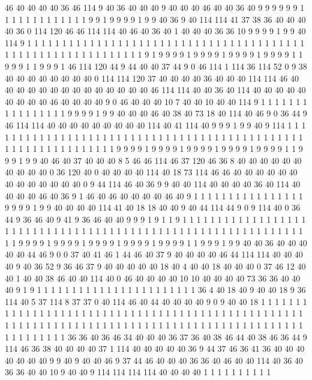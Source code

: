 46 40 40 40 40 36 46 114 9 40 36 40 40 40 9 40 40 40 46 40
40 36 40 9 9 9 9 9 9 1 1 1 1 1 1 1 1 1 1 1
1 1 9 9 1 9 9 9 9 1 9 9 40 36 9 40 114 114 41 37
38 36 40 40 40 40 36 0 114 120 46 46 114 114 40 46 40 36 40 1
40 40 40 36 36 10 9 9 9 9 1 9 9 40 114 9 1 1 1 1
1 1 1 1 1 1 1 1 1 1 1 1 1 1 1 1 1 1 1 1
1 1 1 1 1 1 1 1 1 1 1 1 1 1 1 1 1 1 1 1
1 1 1 1 1 1 1 1 1 1 1 1 1 1 1 1 9 1 9 9
9 9 1 9 9 9 9 1 9 9 9 9 1 9 9 9 9 1 1 9
9 9 1 1 9 9 9 1 46 114 120 44 9 44 40 40 37 44 9 0
46 114 1 114 36 114 52 0 9 38 40 40 40 40 40 40 40 40 0 114
114 120 37 40 40 40 40 36 40 40 40 114 114 46 40 40 40 40 40 40
40 40 40 40 40 40 40 40 46 114 114 40 40 36 40 114 40 40 40 40
40 40 40 40 40 46 40 40 40 40 9 0 46 40 40 40 10 7 40 40
10 40 40 114 9 1 1 1 1 1 1 1 1 1 1 1 1 1 1 1
1 9 9 9 9 1 9 9 40 40 40 46 40 38 40 73 18 40 114 40
46 9 0 36 44 9 46 114 114 40 40 40 40 40 40 40 40 40 114 40
41 114 40 9 9 9 1 9 9 40 9 114 1 1 1 1 1 1 1 1
1 1 1 1 1 1 1 1 1 1 1 1 1 1 1 1 1 1 1 1
1 1 1 1 1 1 1 1 1 1 1 1 1 1 1 1 1 1 1 1
1 1 1 1 1 1 1 1 1 1 1 1 1 1 9 9 9 9 1 9
9 9 9 1 9 9 9 9 1 9 9 9 9 1 9 9 9 9 1 1
9 9 9 1 9 9 40 46 40 37 40 40 40 8 5 46 46 114 46 37
120 46 36 8 40 40 40 40 40 40 40 40 40 40 0 36 120 40 0 40
40 40 40 114 40 18 73 114 46 46 40 40 40 40 40 40 40 40 40 40
40 40 40 0 9 44 114 46 40 36 9 9 40 40 114 40 40 40 40 36
40 114 40 40 40 40 46 40 36 9 1 46 40 46 40 40 40 40 46 40
9 1 1 1 1 1 1 1 1 1 1 1 1 1 1 1 1 9 9 9
9 1 9 9 40 40 40 40 114 41 40 18 18 40 40 9 40 44 114 44
9 0 9 114 40 0 36 44 9 36 46 40 9 41 9 36 46 40 40 9
9 9 1 9 1 1 9 1 1 1 1 1 1 1 1 1 1 1 1 1
1 1 1 1 1 1 1 1 1 1 1 1 1 1 1 1 1 1 1 1
1 1 1 1 1 1 1 1 1 1 1 1 1 1 1 1 1 1 1 1
1 1 1 1 1 1 1 1 1 1 9 9 9 9 1 9 9 9 9 1
9 9 9 9 1 9 9 9 9 1 9 9 9 9 1 1 9 9 9 1
9 9 40 40 36 40 40 40 40 40 44 46 9 0 0 37 40 41 46 1
44 46 40 37 9 40 40 40 40 46 44 114 114 40 40 40 40 9 40 36
52 9 36 46 37 9 40 40 40 40 40 18 40 4 40 40 18 40 40 40
0 37 46 12 40 40 1 40 40 38 46 40 40 114 40 0 46 40 40 40
40 10 10 40 40 40 40 73 36 36 40 40 40 9 1 9 1 1 1 1
1 1 1 1 1 1 1 1 1 1 1 1 1 1 1 1 1 1 1 36
4 40 18 40 9 40 40 18 9 36 114 40 5 37 114 8 37 37 0 40
114 46 40 44 40 40 40 40 9 0 9 40 40 18 1 1 1 1 1 1
1 1 1 1 1 1 1 1 1 1 1 1 1 1 1 1 1 1 1 1
1 1 1 1 1 1 1 1 1 1 1 1 1 1 1 1 1 1 1 1
1 1 1 1 1 1 1 1 1 1 1 1 1 1 1 1 1 1 1 1
1 1 1 1 1 1 1 1 1 1 1 1 1 1 1 1 1 1 1 1
1 1 1 1 1 1 1 1 1 1 1 1 1 1 1 1 36 36 40 36
46 34 40 40 40 36 37 36 40 38 46 44 40 38 46 36 44 9 114 46
36 38 40 40 40 40 37 1 114 40 40 40 40 40 36 9 44 37 46 36
41 36 40 40 40 40 40 40 40 9 9 40 9 40 40 46 9 37 44 46
40 40 40 36 36 40 46 40 40 114 40 36 40 36 36 40 40 10 9 40
40 9 114 114 114 114 40 40 40 40 1 1 1 1 1 1 1 1 1 1
